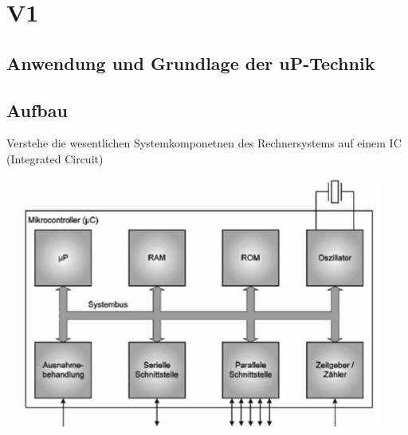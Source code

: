 \section{V1}
\subsection{Anwendung und Grundlage der uP-Technik}

\begin{minipage}{8cm}
    \subsection{Aufbau}
    Verstehe die wesentlichen Systemkomponetnen des Rechnersystems auf einem IC (Integrated Circuit)
\end{minipage}
\begin{minipage}{0.5\linewidth}
    \includegraphics[width=\linewidth]{images/aufbauuC}
\end{minipage}

